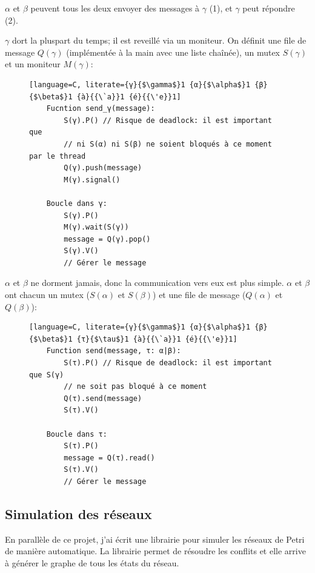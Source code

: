 \documentclass[12pt]{article}
\begin{document}
$\alpha$ et $\beta$ peuvent tous les deux envoyer des messages à $\gamma$ (1), et $\gamma$ peut répondre (2).

$\gamma$ dort la pluspart du temps; il est reveillé via un moniteur.
On définit une file de message $Q(\gamma)$ (implémentée à la main avec une liste chaînée), un mutex $S(\gamma)$ et un moniteur $M(\gamma)$:

\begin{figure}[H]
    \begin{lstlisting}[language=C, literate={γ}{$\gamma$}1 {α}{$\alpha$}1 {β}{$\beta$}1 {à}{{\`a}}1 {é}{{\'e}}1]
    Fucntion send_γ(message):
        S(γ).P() // Risque de deadlock: il est important que
        // ni S(α) ni S(β) ne soient bloqués à ce moment par le thread
        Q(γ).push(message)
        M(γ).signal()

    Boucle dans γ:
        S(γ).P()
        M(γ).wait(S(γ))
        message = Q(γ).pop()
        S(γ).V()
        // Gérer le message
    \end{lstlisting}
\end{figure}

$\alpha$ et $\beta$ ne dorment jamais, donc la communication vers eux est plus simple. $\alpha$ et $\beta$ ont chacun un mutex ($S(\alpha)$ et $S(\beta)$) et une file de message ($Q(\alpha)$ et $Q(\beta)$):

\begin{figure}[H]
    \begin{lstlisting}[language=C, literate={γ}{$\gamma$}1 {α}{$\alpha$}1 {β}{$\beta$}1 {τ}{$\tau$}1 {à}{{\`a}}1 {é}{{\'e}}1]
    Function send(message, τ: α|β):
        S(τ).P() // Risque de deadlock: il est important que S(γ)
        // ne soit pas bloqué à ce moment
        Q(τ).send(message)
        S(τ).V()

    Boucle dans τ:
        S(τ).P()
        message = Q(τ).read()
        S(τ).V()
        // Gérer le message
    \end{lstlisting}
\end{figure}

\subsection{Simulation des réseaux}

En parallèle de ce projet, j'ai écrit une librairie pour simuler les réseaux de Petri de manière automatique.
La librairie permet de résoudre les conflits et elle arrive à générer le graphe de tous les états du réseau.
\end{document}
